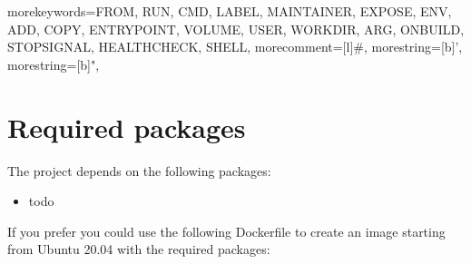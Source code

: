 {
  morekeywords={FROM, RUN, CMD, LABEL, MAINTAINER, EXPOSE, ENV, ADD, COPY,
    ENTRYPOINT, VOLUME, USER, WORKDIR, ARG, ONBUILD, STOPSIGNAL, HEALTHCHECK,
    SHELL},
  morecomment=[l]{\#},
  morestring=[b]',
  morestring=[b]",
}


\chapter{Required packages}
\label{cha:dockerfile}

The project depends on the following packages:

\begin{itemize}
    \item todo
\end{itemize}

If you prefer you could use the following Dockerfile to create an image starting from Ubuntu 20.04 with the required packages:

